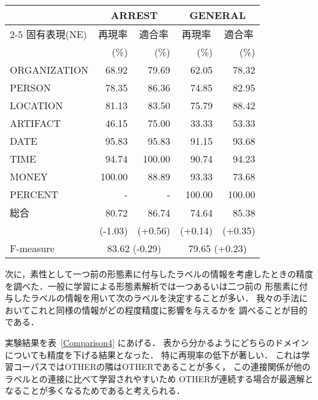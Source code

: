 {\begin{table*}[htbp]
  \begin{center}
    \caption{辞書情報を素性として考慮した場合\mbox{((-2)(-1)(0)(1)(2)を考慮)}}
    \label{Comparison7} 
    \begin{tabular}{|l|r@{ }r|r@{ }r|}
      \hline
      & \multicolumn{2}{c|}{ARREST} 
      & \multicolumn{2}{c|}{GENERAL}\\
      \cline{2-5}
      固有表現(NE) & \multicolumn{1}{c}{再現率} 
      & \multicolumn{1}{c|}{適合率} & \multicolumn{1}{c}{再現率} 
      & \multicolumn{1}{c|}{適合率} \\
      & (\%) & (\%) & (\%) & (\%) \\
      \hline      
      ORGANIZATION &  68.92 &  79.69 &  62.05 &  78.32\\
      PERSON       &  78.35 &  86.36 &  74.85 &  82.95\\
      LOCATION     &  81.13 &  83.50 &  75.79 &  88.42\\
      ARTIFACT     &  46.15 &  75.00 &  33.33 &  53.33\\
      DATE         &  95.83 &  95.83 &  91.15 &  93.68\\
      TIME         &  94.74 & 100.00 &  90.74 &  94.23\\
      MONEY        & 100.00 &  88.89 &  93.33 &  73.68\\
      PERCENT      &      - &      - & 100.00 & 100.00\\
      \hline
      総合 & 80.72 & 86.74 & 74.64 & 85.38\\
      & (-1.03) & (+0.56) & (+0.14) & (+0.35) \\
      \hline
      \hline
      F-measure & \multicolumn{2}{c|}{83.62 (-0.29)} 
      & \multicolumn{2}{c|}{79.65 (+0.23)} \\
      \hline
    \end{tabular}
  \end{center}
\end{table*}
}

次に，素性として一つ前の形態素に付与したラベルの情報を考慮したときの精度
を調べた．一般に学習による形態素解析では一つあるいは二つ前の
形態素に付与したラベルの情報を用いて次のラベルを決定することが多い．
我々の手法においてこれと同様の情報がどの程度精度に影響を与えるかを
調べることが目的である．

実験結果を表~\ref{Comparison4} にあげる．
表から分かるようにどちらのドメインについても精度を下げる結果となった．
特に再現率の低下が著しい．
これは学習コーパスではOTHERの隣はOTHERであることが多く，
この連接関係が他のラベルとの連接に比べて学習されやすいため
OTHERが連続する場合が最適解となることが多くなるためであると考えられる．

